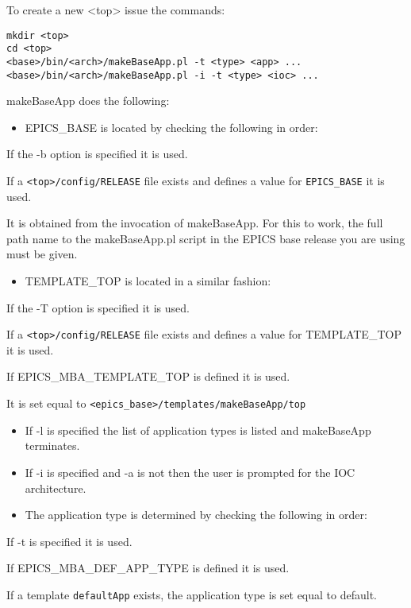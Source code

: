 To create a new \textless{}top\textgreater{} issue the commands:

\begin{verbatim}mkdir <top>
cd <top>
<base>/bin/<arch>/makeBaseApp.pl -t <type> <app> ... 
<base>/bin/<arch>/makeBaseApp.pl -i -t <type> <ioc> ...
\end{verbatim}makeBaseApp does the following:

\begin{itemize}\item EPICS\_BASE is located by checking the following in order:

\end{itemize}If the -b option is specified it is used.

If a \verb|<top>/config/RELEASE| file exists and defines a value for \verb|EPICS_BASE| it is used.

It is obtained from the invocation of makeBaseApp. For this to work, the full path name to the 
makeBaseApp.pl script in the EPICS base release you are using must be given.

\begin{itemize}\item TEMPLATE\_TOP is located in a similar fashion:

\end{itemize}If the -T option is specified it is used.

If a \verb|<top>/config/RELEASE| file exists and defines a value for TEMPLATE\_TOP it is used.

If EPICS\_MBA\_TEMPLATE\_TOP is defined it is used.

It is set equal to \verb|<epics_base>/templates/makeBaseApp/top|

\begin{itemize}\item If -l is specified the list of application types is listed and makeBaseApp terminates.

\item If -i is specified and -a is not then the user is prompted for the IOC architecture.

\item The application type is determined by checking the following in order:

\end{itemize}If -t is specified it is used.

If EPICS\_MBA\_DEF\_APP\_TYPE is defined it is used.

If a template \verb|defaultApp| exists, the application type is set equal to default.

